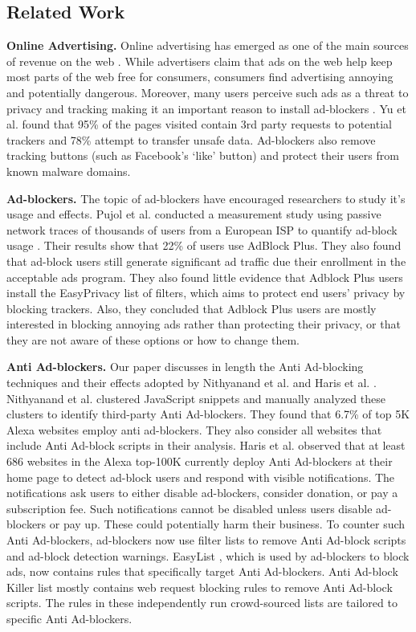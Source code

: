 \documentclass[runningheads,a4paper]{llncs}
\begin{document}
\subsection{Related Work}
\textbf{Online Advertising.} Online advertising has emerged as one of the main sources of revenue on the web \cite{largest2017}. While advertisers claim
that ads on the web help keep most parts of the web free for consumers, consumers find advertising annoying
and potentially dangerous. Moreover, many users perceive such ads as a threat to privacy and tracking making it an important reason to install ad-blockers \cite{popularity2017}. Yu et al. \cite{Yu2016} found that 95\% of the pages visited contain 3rd party requests to potential trackers and 78\% attempt to transfer unsafe data. Ad-blockers also remove tracking buttons (such as Facebook’s ‘like’ button) and protect their users
from known malware domains.

\textbf{Ad-blockers.} The topic of ad-blockers have encouraged researchers to study it's usage and effects. Pujol et al. conducted a measurement study using passive network traces of thousands of users from a European ISP to quantify ad-block usage \cite{Pujol2015}. Their
results show that 22\% of users use AdBlock Plus. They
also found that ad-block users still generate significant
ad traffic due their enrollment in the acceptable
ads program. They also found little evidence that Adblock Plus users install the EasyPrivacy \cite{easyPrivacy} list of filters, which aims to protect end users’ privacy by blocking trackers. Also, they concluded that Adblock Plus users are mostly interested in blocking annoying ads rather than protecting their privacy, or that they are not aware of these options or how to change them.

\textbf{Anti Ad-blockers.} Our paper discusses in length the Anti Ad-blocking techniques and their effects adopted by Nithyanand et al. \cite{Rishab2016} and Haris et al. \cite{Haris2015}. Nithyanand et al. \cite{Rishab2016} clustered JavaScript snippets and manually analyzed these
clusters to identify third-party Anti Ad-blockers. They
found that 6.7\% of top 5K Alexa websites employ anti
ad-blockers. They also consider all websites that include Anti Ad-block scripts in their analysis. Haris et al. \cite{Haris2015} observed that at least 686 websites in the Alexa top-100K currently deploy Anti Ad-blockers at their home page to detect ad-block users and respond with visible notifications. The notifications ask users to either disable ad-blockers, consider donation, or pay a subscription fee. Such notifications cannot be disabled unless users disable ad-blockers or pay up. These could potentially harm their business. To counter such Anti Ad-blockers, ad-blockers now use filter lists to
remove Anti Ad-block scripts and ad-block detection
warnings. EasyList \cite{easyList}, which is used by ad-blockers to block ads, now contains rules that specifically target Anti Ad-blockers. Anti Ad-block Killer
list \cite{aakl} mostly contains web request blocking rules to remove Anti Ad-block scripts. The rules in these independently run crowd-sourced lists are tailored to specific Anti Ad-blockers.
\end{document}
